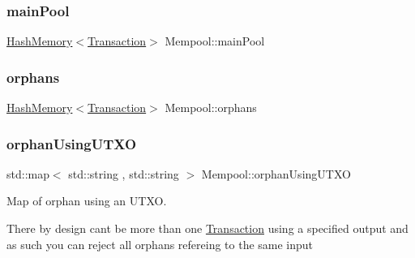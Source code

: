 \mbox{\label{classMempool_a6c0f587b34c99369786379717b0b1347}} 
\subsubsection{\texorpdfstring{main\+Pool}{mainPool}}
{\footnotesize\ttfamily \mbox{\hyperlink{classHashMemory}{Hash\+Memory}}$<$\mbox{\hyperlink{classTransaction}{Transaction}}$>$ Mempool\+::main\+Pool\hspace{0.3cm}{\ttfamily [private]}}

\mbox{\label{classMempool_a215dd76ed87ac826511573e8fc91885a}} 
\subsubsection{\texorpdfstring{orphans}{orphans}}
{\footnotesize\ttfamily \mbox{\hyperlink{classHashMemory}{Hash\+Memory}}$<$\mbox{\hyperlink{classTransaction}{Transaction}}$>$ Mempool\+::orphans\hspace{0.3cm}{\ttfamily [private]}}

\mbox{\label{classMempool_a6a590208186b95856029bfa2613fbf04}} 
\subsubsection{\texorpdfstring{orphan\+Using\+U\+T\+XO}{orphanUsingUTXO}}
{\footnotesize\ttfamily std\+::map$<$ std\+::string , std\+::string $>$ Mempool\+::orphan\+Using\+U\+T\+XO\hspace{0.3cm}{\ttfamily [private]}}



Map of orphan using an U\+T\+XO. 

There by design can\textquotesingle{}t be more than one \mbox{\hyperlink{classTransaction}{Transaction}} using a specified output and as such you can reject all orphans refereing to the same input \mbox{\label{classMempool_a84442d6065be70b7411d4376887c7858}} 
